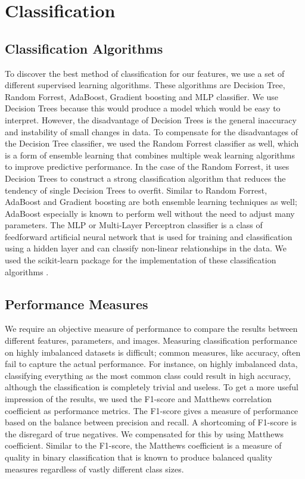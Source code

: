 \section{Classification}

\subsection{Classification Algorithms}
To discover the best method of classification for our features, we use a set of different supervised learning algorithms. These algorithms are Decision Tree, Random Forrest, AdaBoost, Gradient boosting and MLP classifier. We use Decision Trees because this would produce a model which would be easy to interpret. However, the disadvantage of Decision Trees is the general inaccuracy and instability of small changes in data. To compensate for the disadvantages of the Decision Tree classifier, we used the Random Forrest classifier as well, which is a form of ensemble learning that combines multiple weak learning algorithms to improve predictive performance. In the case of the Random Forrest, it uses Decision Trees to construct a strong classification algorithm that reduces the tendency of single Decision Trees to overfit. Similar to Random Forrest, AdaBoost and Gradient boosting are both ensemble learning techniques as well; AdaBoost especially is known to perform well without the need to adjust many parameters. The MLP  or Multi-Layer Perceptron classifier is a class of feedforward artificial neural network that is used for training and classification using a hidden layer and can classify non-linear relationships in the data. We used the scikit-learn package for the implementation of these classification algorithms \cite{scikit-learn}.

\subsection{Performance Measures}
We require an objective measure of performance to compare the results between different features, parameters, and images. Measuring classification performance on highly imbalanced datasets is difficult; common measures, like accuracy, often fail to capture the actual performance. For instance, on highly imbalanced data, classifying everything as the most common class could result in high accuracy, although the classification is completely trivial and useless. To get a more useful impression of the results, we used the F1-score and Matthews correlation coefficient as performance metrics. The F1-score gives a measure of performance based on the balance between precision and recall. A shortcoming of F1-score is the disregard of true negatives. We compensated for this by using Matthews coefficient. Similar to the F1-score, the Matthews coefficient is a measure of quality in binary classification that is known to produce balanced quality measures regardless of vastly different class sizes.

